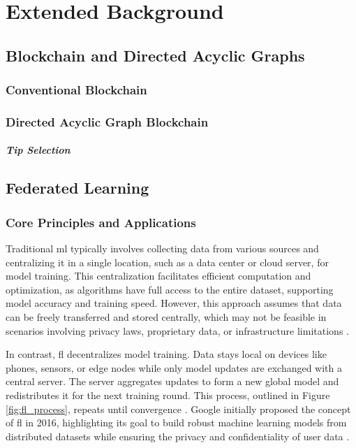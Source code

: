\chapter{Extended Background} \label{cha:extended_background}

\section{Blockchain and Directed Acyclic Graphs}
\subsection{Conventional Blockchain}
\subsection{Directed Acyclic Graph Blockchain}
\paragraph{Tip Selection}

\newpage
\section{Federated Learning}
\subsection{Core Principles and Applications}
Traditional \ac{ml} typically involves collecting data from various sources and centralizing it in a single location, such as a data center or cloud server, for model training. This centralization facilitates efficient computation and optimization, as algorithms have full access to the entire dataset, supporting model accuracy and training speed. However, this approach assumes that data can be freely transferred and stored centrally, which may not be feasible in scenarios involving privacy laws, proprietary data, or infrastructure limitations \cite{yang_federated_2019}. 

In contrast, \ac{fl} decentralizes model training. Data stays local on devices like phones, sensors, or edge nodes while only model updates are exchanged with a central server. The server aggregates updates to form a new global model and redistributes it for the next training round. This process, outlined in Figure \ref{fig:fl_process}, repeats until convergence \cite{zhang_survey_2021}. Google initially proposed the concept of \ac{fl} in 2016, highlighting its goal to build robust machine learning models from distributed datasets while ensuring the privacy and confidentiality of user data \cite{mcmahan_communication-efficient_2016}.

